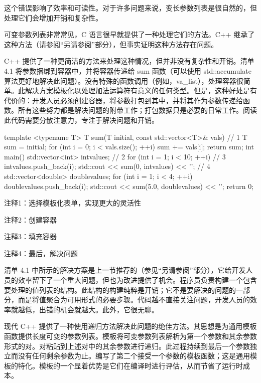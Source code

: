 这个错误影响了效率和可读性。对于许多问题来说，变长参数列表是很自然的，但处理它们会增加开销和复杂性。


可变参数列表非常常见，C 语言很早就提供了一种处理它们的方法。C++ 继承了这种方法（请参阅“另请参阅”部分），但事实证明这种方法存在问题。

C++ 提供了一种更简洁的方法来处理这种情况，但并非没有复杂性和开销。清单 4.1 将参数捆绑到容器中，并将容器传递给 sum 函数（可以使用 std::accumulate 算法更好地解决此问题）。没有特殊的函数调用（例如，va\_list），处理容器很简单。此解决方案模板化以处理加法运算符有意义的任何类型。但是，这种好处是有代价的：开发人员必须创建容器，将参数打包到其中，并将其作为参数传递给函数。所有这些努力都是解决问题的附带工作；打包数据只是必要的日常工作。阅读此代码需要分散注意力，专注于解决问题和开销。


\begin{cpp}
template <typename T>
T sum(T initial, const std::vector<T>& vals) { // 1
  T sum = initial;
  for (int i = 0; i < vals.size(); ++i)
    sum += vals[i];
  return sum;
}
int main() {
  std::vector<int> intvalues; // 2
  for (int i = 1; i < 10; ++i) // 3
    intvalues.push_back(i);
  std::cout << sum(0, intvalues) << '\n'; // 4
  std::vector<double> doublevalues;
  for (int i = 1; i < 4; ++i)
    doublevalues.push_back(i);
  std::cout << sum(5.0, doublevalues) << '\n';
  return 0;
}
\end{cpp}

{\footnotesize
注释1：选择模板化表单，实现更大的灵活性

注释2：创建容器

注释3：填充容器

注释4：最后，解决问题
}


清单 4.1 中所示的解决方案是上一节推荐的（参见“另请参阅”部分），它给开发人员的效率留下了一个重大问题，但也为改进提供了机会。程序员负责构建一个包含要处理的值列表的结构。此结构的构建纯粹是开销；它不是要解决的问题的一部分，而是将值聚合为可用形式的必要步骤。代码越不直接关注问题，开发人员的效率就越低，出错的机会就越大。此外，它很无聊。


现代 C++ 提供了一种使用递归方法解决此问题的绝佳方法。其思想是为通用模板函数提供长度可变的参数列表。模板将可变参数列表解析为第一个参数和其余参数形式的对。对粘贴到上述对中的其余参数进行递归。此过程持续到最后一个参数独立而没有任何剩余参数为止。编写了第二个接受一个参数的模板函数；这是通用模板的特化。模板的一个显着优势是它们在编译时进行评估，从而节省了运行时成本。

